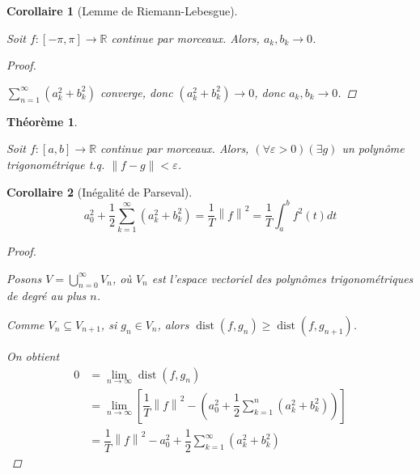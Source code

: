\documentclass{report}
\newcommand*{\dsum}[4]{\displaystyle\sum_{#1=#2}^{#3}#4}
\newcommand*{\dlim}[3]{\displaystyle\lim_{#1 \to #2}#3}
\newcommand*{\dint}[3]{\displaystyle\int_{#1}^{#2}#3}
\newcommand*{\norme}[1]{\left\| #1 \right\|}
\newcommand*{\eps}{\varepsilon}
\newcommand*{\gte}{\geqslant}
\newcommand*{\reels}{\mathbb{R}}
\newtheorem*{thm}{Th\'eor\`eme}
\newtheorem*{coro}{Corollaire}
\theoremstyle{definition}
\theoremstyle{remark}
\begin{document}
	\begin{coro}[Lemme de Riemann-Lebesgue]~

		Soit $f:[-\pi,\pi] \to \reels$ continue par morceaux. Alors, $a_k,b_k \to 0$.
		\begin{proof}~

			$\dsum{n}{1}{\infty}{(a_k^2+b_k^2)}$ converge, donc $(a_k^2+b_k^2) \to 0$, donc $a_k,b_k \to 0$.
		\end{proof}
	\end{coro}
	\begin{thm}~

		Soit $f:[a,b] \to \reels$ continue par morceaux. Alors, $(\forall \eps>0)(\exists g)$ un polyn\^ome trigonom\'etrique t.q. $\norme{f-g} < \eps$.
	\end{thm}
	\begin{coro}[In\'egalit\'e de Parseval]
		\begin{equation*}
			a_0^2 + \dfrac{1}{2} \dsum{k}{1}{\infty}{\left( a_k^2+b_k^2 \right)} = \dfrac{1}{T} \norme{f}^2 = \dfrac{1}{T} \dint{a}{b}{f^2(t) dt}
		\end{equation*}
		\begin{proof}~

			Posons $V = \bigcup\limits_{n=0}^{\infty} V_n$, o\`u $V_n$ est l'espace vectoriel des polyn\^omes trigonom\'etriques de degr\'e au plus $n$.

			Comme $V_n \subseteq V_{n+1}$, si $g_n \in V_n$, alors $\operatorname{dist}(f,g_n) \gte \operatorname{dist}(f,g_{n+1})$.

			On obtient
			\begin{align*}
				0&= \dlim{n}{\infty}{\operatorname{dist}(f,g_n)}\\
				&= \dlim{n}{\infty}{\left[ \dfrac{1}{T} \norme{f}^2 - \left( a_0^2 + \dfrac{1}{2} \dsum{k}{1}{n}{\left( a_k^2+b_k^2 \right)} \right) \right]}\\
				&= \dfrac{1}{T} \norme{f}^2 - a_0^2 + \dfrac{1}{2} \dsum{k}{1}{\infty}{\left( a_k^2+b_k^2 \right)}
			\end{align*}
		\end{proof}
	\end{coro}
\end{document}
